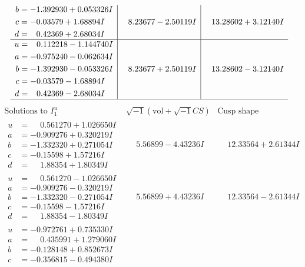 \documentclass[1p]{elsarticle_modified}
\theoremstyle{definition}
\newcommand{\I}{\sqrt{-1}}
\begin{document}
$$\begin{array}{c|c|c}
\begin{aligned}
b &= -1.392930 + 0.053326 I \\
c &= -0.03579 + 1.68894 I \\
d &= \phantom{-}0.42369 + 2.68034 I\end{aligned}
 & \phantom{-}8.23677 - 2.50119 I & \phantom{-}13.28602 + 3.12140 I \\ \hline\begin{aligned}
u &= \phantom{-}0.112218 - 1.144740 I \\
a &= -0.975240 - 0.062634 I \\
b &= -1.392930 - 0.053326 I \\
c &= -0.03579 - 1.68894 I \\
d &= \phantom{-}0.42369 - 2.68034 I\end{aligned}
 & \phantom{-}8.23677 + 2.50119 I & \phantom{-}13.28602 - 3.12140 I\\
 \hline 
 \end{array}$$\newpage$$\begin{array}{c|c|c}  
\text{Solutions to }I^u_{1}& \I (\text{vol} + \sqrt{-1}CS) & \text{Cusp shape}\\
 \hline 
\begin{aligned}
u &= \phantom{-}0.561270 + 1.026650 I \\
a &= -0.909276 + 0.320219 I \\
b &= -1.332320 + 0.271054 I \\
c &= -0.15598 + 1.57216 I \\
d &= \phantom{-}1.88354 + 1.80349 I\end{aligned}
 & \phantom{-}5.56899 - 4.43236 I & \phantom{-}12.33564 + 2.61344 I \\ \hline\begin{aligned}
u &= \phantom{-}0.561270 - 1.026650 I \\
a &= -0.909276 - 0.320219 I \\
b &= -1.332320 - 0.271054 I \\
c &= -0.15598 - 1.57216 I \\
d &= \phantom{-}1.88354 - 1.80349 I\end{aligned}
 & \phantom{-}5.56899 + 4.43236 I & \phantom{-}12.33564 - 2.61344 I \\ \hline\begin{aligned}
u &= -0.972761 + 0.735330 I \\
a &= \phantom{-}0.435991 + 1.279060 I \\
b &= -0.128148 + 0.852673 I \\
c &= -0.356815 - 0.494380 I \\

\end{aligned}
\end{array}$$
\end{document}
